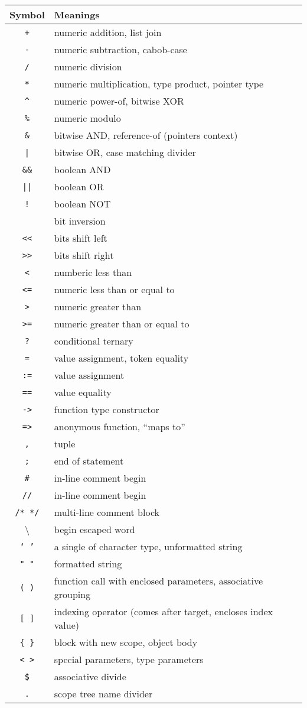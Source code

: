 \documentclass{article}
\newcommand{\code}[1]{\texttt{#1}}
\begin{document}
	\begin{tabular}{c|l}
		Symbol  & Meanings \\ \hline
		\code{+} 	&numeric addition, list join \\
		\code{-} 	&numeric subtraction, cabob-case \\
		\code{/} 	&numeric division \\
		\code{*} 	&numeric multiplication, type product, pointer type \\
		\code{\textasciicircum} &numeric power-of, bitwise XOR \\
		\code{\%}   &numeric modulo \\
		\code{\&}   	&bitwise AND, reference-of (pointers context) \\
		\code{|}    	&bitwise OR, case matching divider \\
		\code{\&\&} 	&boolean AND \\
		\code{||}	&boolean OR \\
		\code{!} 		&boolean NOT\\
		\texttildelow & bit inversion \\
		\code{<<}	&bits shift left \\
		\code{>>}	&bits shift right \\
		\code{<}		&numberic less than \\
		\code{<=}	&numeric less than or equal to\\
		\code{>}		&numeric greater than \\
		\code{>=} 	&numeric greater than or equal to\\
		\code{?}		&conditional ternary \\
		\code{=}		&value assignment, token equality \\
		\code{:=}	&value assignment \\
		\code{==}	&value equality \\
		\code{->}	&function type constructor \\
		\code{=>}	&anonymous function, ``maps to'' \\
		\code{,} 		&tuple \\
		\code{;}		&end of statement \\
		\code{\#}		&in-line comment begin \\
		\code{//} 		&in-line comment begin \\
		\code{/* */}   &multi-line comment block \\
		\textbackslash &begin escaped word \\
		\code{` '}	&a single of character type, unformatted string\\
		\code{" "}	&formatted string \\
		\code{( )} 	&function call with enclosed parameters, associative grouping \\
		\code{[ ]}	&indexing operator (comes after target, encloses index value)\\
		\code{\{ \}}	&block with new scope, object body \\
		\code{< >} &special parameters, type parameters \\
		\code{\$}		&associative divide \\
		\code{.}       &scope tree name divider
	\end{tabular}
\end{document}
